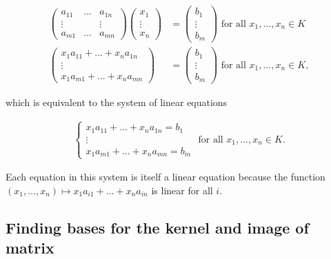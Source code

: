 \begin{deriv}
    \begin{align*}
        \begin{pmatrix}
            a_{11} & \hdots & a_{1n} \\
            \vdots & & \vdots \\
            a_{m1} & \hdots & a_{mn}
        \end{pmatrix}
        \begin{pmatrix}
            x_1 \\ \vdots \\ x_n
        \end{pmatrix}
        &=
        \begin{pmatrix}
            b_1 \\ \vdots \\ b_m
        \end{pmatrix}
        \text{ for all $x_1, ..., x_n \in K$}
        \\
        \begin{pmatrix}
            x_1 a_{11} + ... + x_n a_{1n} \\
            \vdots \\
            x_1 a_{m1} + ... + x_n a_{mn}
        \end{pmatrix}
        &=
        \begin{pmatrix}
            b_1 \\ \vdots \\ b_m
        \end{pmatrix}
        \text{ for all $x_1, ..., x_n \in K$},
    \end{align*}

    which is equivalent to the system of linear equations

    \begin{align*}
        \begin{cases}
            x_1 a_{11} + ... + x_n a_{1n} = b_1 \\
            \vdots \\
            x_1 a_{m1} + ... + x_n a_{mn} = b_m
        \end{cases}
        \text{ for all $x_1, ..., x_n \in K$}.
    \end{align*}

    Each equation in this system is itself a linear equation because the function $(x_1, ..., x_n) \mapsto x_1 a_{i1} + ... + x_n a_{in}$ is linear for all $i$.
\end{deriv}

\subsection*{Finding bases for the kernel and image of matrix}


